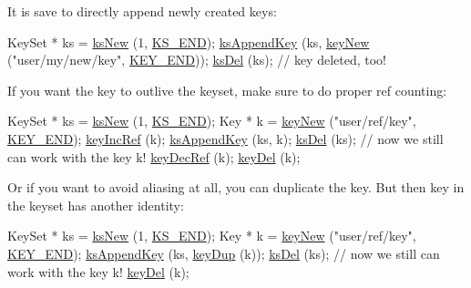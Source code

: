 It is save to directly append newly created keys\+: 
\begin{DoxyCodeInclude}
KeySet * ks = \hyperlink{group__keyset_ga671e1aaee3ae9dc13b4834a4ddbd2c3c}{ksNew} (1, \hyperlink{kdbenum_8c_a7a28fce3773b2c873c94ac80b8b4cd54}{KS\_END});
\hyperlink{group__keyset_gaa5a1d467a4d71041edce68ea7748ce45}{ksAppendKey} (ks, \hyperlink{group__key_gad23c65b44bf48d773759e1f9a4d43b89}{keyNew} (\textcolor{stringliteral}{"user/my/new/key"}, \hyperlink{group__key_gga91fb3178848bd682000958089abbaf40aa8adb6fcb92dec58fb19410eacfdd403}{KEY\_END}));
\hyperlink{group__keyset_ga27e5c16473b02a422238c8d970db7ac8}{ksDel} (ks);
\textcolor{comment}{// key deleted, too!}
\end{DoxyCodeInclude}
 If you want the key to outlive the keyset, make sure to do proper ref counting\+: 
\begin{DoxyCodeInclude}
KeySet * ks = \hyperlink{group__keyset_ga671e1aaee3ae9dc13b4834a4ddbd2c3c}{ksNew} (1, \hyperlink{kdbenum_8c_a7a28fce3773b2c873c94ac80b8b4cd54}{KS\_END});
Key * k = \hyperlink{group__key_gad23c65b44bf48d773759e1f9a4d43b89}{keyNew} (\textcolor{stringliteral}{"user/ref/key"}, \hyperlink{group__key_gga91fb3178848bd682000958089abbaf40aa8adb6fcb92dec58fb19410eacfdd403}{KEY\_END});
\hyperlink{group__key_ga6970a6f254d67af7e39f8e469bb162f1}{keyIncRef} (k);
\hyperlink{group__keyset_gaa5a1d467a4d71041edce68ea7748ce45}{ksAppendKey} (ks, k);
\hyperlink{group__keyset_ga27e5c16473b02a422238c8d970db7ac8}{ksDel} (ks);
\textcolor{comment}{// now we still can work with the key k!}
\hyperlink{group__key_ga2c6433ca22109e4e141946057eccb283}{keyDecRef} (k);
\hyperlink{group__key_ga3df95bbc2494e3e6703ece5639be5bb1}{keyDel} (k);
\end{DoxyCodeInclude}
 Or if you want to avoid aliasing at all, you can duplicate the key. But then key in the keyset has another identity\+: 
\begin{DoxyCodeInclude}
KeySet * ks = \hyperlink{group__keyset_ga671e1aaee3ae9dc13b4834a4ddbd2c3c}{ksNew} (1, \hyperlink{kdbenum_8c_a7a28fce3773b2c873c94ac80b8b4cd54}{KS\_END});
Key * k = \hyperlink{group__key_gad23c65b44bf48d773759e1f9a4d43b89}{keyNew} (\textcolor{stringliteral}{"user/ref/key"}, \hyperlink{group__key_gga91fb3178848bd682000958089abbaf40aa8adb6fcb92dec58fb19410eacfdd403}{KEY\_END});
\hyperlink{group__keyset_gaa5a1d467a4d71041edce68ea7748ce45}{ksAppendKey} (ks, \hyperlink{group__key_gae6ec6a60cc4b8c1463fa08623d056ce3}{keyDup} (k));
\hyperlink{group__keyset_ga27e5c16473b02a422238c8d970db7ac8}{ksDel} (ks);
\textcolor{comment}{// now we still can work with the key k!}
\hyperlink{group__key_ga3df95bbc2494e3e6703ece5639be5bb1}{keyDel} (k);
\end{DoxyCodeInclude}


